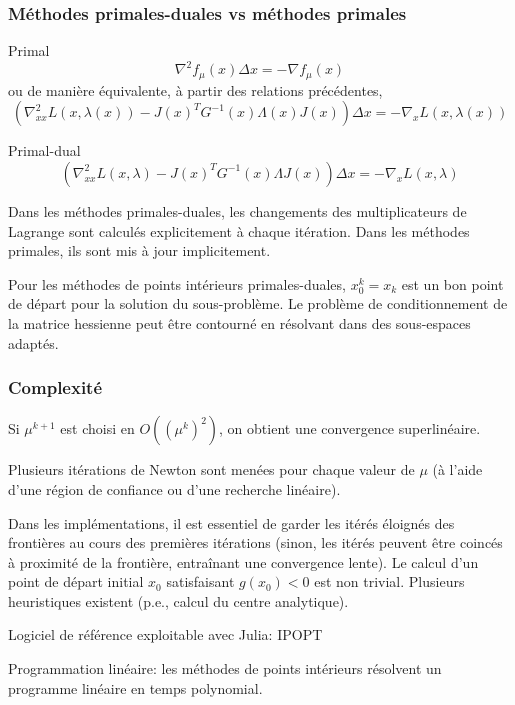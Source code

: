 \documentclass[usepdftitle=false,aspectratio=169]{beamer}
\def\blue{\color{blue}}
\begin{document}
\begin{frame}
\frametitle{Méthodes primales-duales vs méthodes primales}

{\blue Primal}
$$
\nabla^2 f_{\mu}(x)\Delta x = -\nabla f_{\mu}(x)
$$
ou de manière équivalente, à partir des relations précédentes,
$$
( \nabla^2_{xx} L(x,\lambda(x)) - J(x)^TG^{-1}(x) \Lambda(x) J(x)) \Delta x
 = -\nabla_x L(x,\lambda(x))
$$

{\blue Primal-dual}
$$
( \nabla^2_{xx} L(x, \lambda) - J(x)^TG^{-1}(x) \Lambda J(x)) \Delta x =  -\nabla_x L(x,\lambda)
$$

Dans les méthodes primales-duales, les changements des multiplicateurs de Lagrange sont calculés explicitement à chaque itération.
Dans les méthodes primales, ils sont mis à jour implicitement.

\mbox{}

Pour les méthodes de points intérieurs primales-duales, $x_0^k = x_k$ est un bon point de départ pour la solution du sous-problème.
Le problème de conditionnement de la matrice hessienne peut être contourné en résolvant dans des sous-espaces adaptés.

\end{frame}

\begin{frame}
\frametitle{Complexité}

Si $\mu^{k+1}$ est choisi en $O((\mu^k)^2)$, on obtient une convergence superlinéaire.

\mbox{}

Plusieurs itérations de Newton sont menées pour chaque valeur de $\mu$ (à l'aide d'une région de confiance ou d'une recherche linéaire).

\mbox{}

Dans les implémentations, il est essentiel de garder les itérés éloignés des frontières au cours des premières itérations (sinon, les itérés peuvent être coincés à proximité de la frontière, entraînant une convergence lente).
Le calcul d'un point de départ initial $x_0$ satisfaisant $g(x_0) < 0$ est non trivial.
Plusieurs heuristiques existent (p.e., calcul du centre analytique).

\mbox{}

Logiciel de référence exploitable avec Julia: IPOPT

\mbox{}

Programmation linéaire: les méthodes de points intérieurs résolvent un programme linéaire en temps polynomial.

\end{frame}
\end{document}
